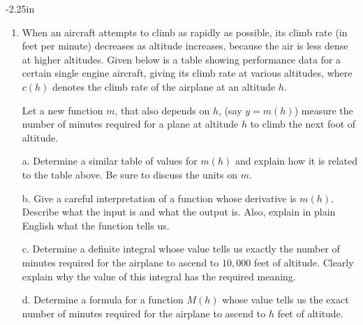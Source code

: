 \begin{adjustwidth*}{}{-2.25in}
\begin{multicols*}{2}
\begin{enumerate}[1)]
\item When an aircraft attempts to climb as rapidly as
possible, its climb rate (in feet per minute) decreases as altitude
increases, because the air is less dense at higher altitudes.
Given below is a table showing performance data for a certain
single engine aircraft, giving its climb rate at various altitudes, where  $c(h)$ denotes the climb rate of the airplane at an altitude $h$.

\begin{center}
\scalebox{.9}{
  \begin{tabular}{|c||c|c|c|c|c|c|}%
    \hline
    $h$ (feet)& $0$ & $1000$ & $2000$ & $3000$ & $4000$ & $5000$ \\%
    \hline
    $c$ (ft/min)& $925$ & $875$ & $830$ & $780$ & $730$ & $685$ \\%
    \hline
    \hline
    $h$ (feet)& $6000$ & $7000$ & $8000$ & $9000$ & $10,000$ &\\
    \hline
    $c$ (ft/min)& $635$ & $585$ & $535$ & $490$ & $440$ &\\
    \hline    
  \end{tabular}
} %
\end{center}

 Let a new function $m$, that also depends on $h$, (say $y = m(h)$) measure
the number of minutes required for a plane at altitude $h$ to climb the
next foot of altitude.
\ba
	\item[a.] Determine a similar table of values for $m(h)$ and explain how it is related to the table above.  Be sure to discuss the units on $m$.

	\item[b.] Give a careful interpretation of a function whose derivative
is $m(h)$.  Describe what the input is and what the output is.  Also,
explain in plain English what the function tells us.

	\item[c.] Determine a definite integral whose value tells us exactly the number of minutes required for the airplane to ascend to
$10,000$ feet of altitude.  Clearly explain why the value of this integral has the required meaning.  

	\item[d.] Determine a formula for a function $M(h)$ whose value tells us the exact number of minutes required for the airplane to ascend to $h$ feet of altitude.


\end{enumerate}
\end{multicols*}
\end{adjustwidth*}
